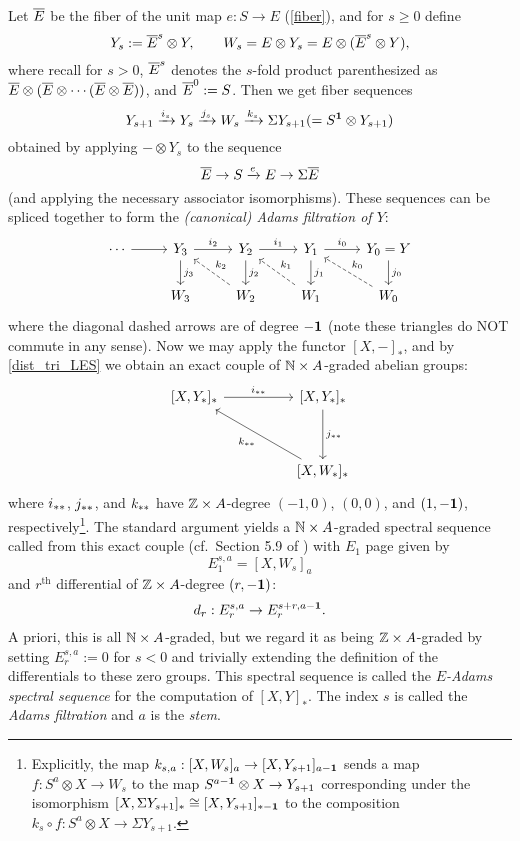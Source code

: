 \documentclass[../main.tex]{subfiles}
\begin{document}
\begin{definition}\label{mASS}
	Let $\overline E$ be the fiber of the unit map $e:S\to E$ (\autoref{fiber}), and for $s\geq0$ define
	\[Y_s:=\overline E^s\otimes Y,\qquad W_s = E\otimes Y_s=E\otimes(\overline E^s\otimes Y),\]
	where recall for $s>0$, $\overline E^s$ denotes the $s$-fold product parenthesized as $\overline E\otimes(\overline E\otimes\cdots(\overline E\otimes\overline E))$, and $\overline E^0:=S$. Then we get fiber sequences
	\[Y_{s+1}\xrightarrow{i_s}Y_s\xrightarrow{j_s} W_s\xrightarrow{k_s}\Sigma Y_{s+1}(=S^{\mathbf{1}}\otimes Y_{s+1})\]
	obtained by applying $-\otimes Y_s$ to the sequence
	\[\overline E\to S\xrightarrow eE\to\Sigma\overline E\]
	(and applying the necessary associator isomorphisms). These sequences can be spliced together to form the \emph{(canonical) Adams filtration of $Y$}:
	\[\begin{tikzcd}
		\cdots & {Y_3} & {Y_2} & {Y_1} & {Y_0=Y} \\
		& {W_3} & {W_2} & {W_1} & {W_0}
		\arrow[from=1-1, to=1-2]
		\arrow["{i_2}", from=1-2, to=1-3]
		\arrow["{i_1}", from=1-3, to=1-4]
		\arrow["{i_0}", from=1-4, to=1-5]
		\arrow["{j_0}", from=1-5, to=2-5]
		\arrow["{k_0}"', dashed, from=2-5, to=1-4]
		\arrow["{j_1}", from=1-4, to=2-4]
		\arrow["{k_1}"', dashed, from=2-4, to=1-3]
		\arrow["{j_3}", from=1-2, to=2-2]
		\arrow["{j_2}", from=1-3, to=2-3]
		\arrow["{k_2}"', dashed, from=2-3, to=1-2]
	\end{tikzcd}\]
	where the diagonal dashed arrows are of degree $-\mathbf{1}$ (note these triangles do NOT commute in any sense). Now we may apply the functor $[X,-]_\ast$, and by \autoref{dist_tri_LES} we obtain an exact couple of $\mathbb{N}\times A$-graded abelian groups:
	\[\begin{tikzcd}
		{[X,Y_\ast]_\ast} && {[X,Y_\ast]_\ast} \\
		\\
		&& {[X,W_\ast]_\ast}
		\arrow["{i_\aast}", from=1-1, to=1-3]
		\arrow["{j_\aast}", from=1-3, to=3-3]
		\arrow["{k_\aast}", from=3-3, to=1-1]
	\end{tikzcd}\]
	where $i_{\ast\ast}$, $j_{\ast\ast}$, and $k_{\ast\ast}$ have $\mathbb{Z}\times A$-degree $(-1,0)$, $(0,0)$, and $(1,-\mathbf{1})$, respectively\footnote{Explicitly, the map $k_{s,a}:[X,W_s]_a\to [X,Y_{s+1}]_{a-\mathbf{1}}$ sends a map $f:S^a\otimes X\to W_s$ to the map $S^{a-\mathbf{1}}\otimes X\to Y_{s+1}$ corresponding under the isomorphism $[X,\Sigma Y_{s+1}]_\ast\cong[X,Y_{s+1}]_{\ast-\mathbf{1}}$ to the composition $k_s\circ f:S^a\otimes X\to\Sigma Y_{s+1}$.}. The standard argument yields a $\mathbb{N}\times A$-graded spectral sequence called from this exact couple (cf.\ Section 5.9 of \cite{Weibel_1994}) with $E_1$ page given by 
	\[E_1^{s,a}=[X,W_s]_{a}\]
	and $r^\text{th}$ differential of $\mathbb{Z}\times A$-degree $(r,-\mathbf{1})$:
	\[d_r:E_r^{s,a}\to E_r^{s+r,a-\mathbf{1}}.\]
	A priori, this is all $\mathbb{N}\times A$-graded, but we regard it as being $\mathbb{Z}\times A$-graded by setting $E_r^{s,a}:=0$ for $s<0$ and trivially extending the definition of the differentials to these zero groups. This spectral sequence is called the \emph{$E$-Adams spectral sequence} for the computation of $[X,Y]_\ast$. The index $s$ is called the \emph{Adams filtration} and $a$ is the \emph{stem}.
\end{definition}
\end{document}
